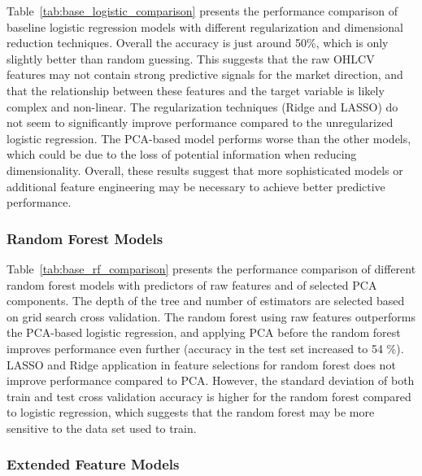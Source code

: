 \documentclass[11pt]{article}
\begin{document}
\FloatBarrier

Table~\ref{tab:base_logistic_comparison} presents the performance comparison of baseline logistic regression models with different regularization and dimensional reduction techniques. Overall the accuracy is just around 50\%, which is only slightly better than random guessing. This suggests that the raw OHLCV features may not contain strong predictive signals for the market direction, and that the relationship between these features and the target variable is likely complex and non-linear. The regularization techniques (Ridge and LASSO) do not seem to significantly improve performance compared to the unregularized logistic regression. The PCA-based model performs worse than the other models, which could be due to the loss of potential information when reducing dimensionality. Overall, these results suggest that more sophisticated models or additional feature engineering may be necessary to achieve better predictive performance.

\subsubsection{Random Forest Models}%



\FloatBarrier

Table~\ref{tab:base_rf_comparison} presents the performance comparison of different random forest models with predictors of raw features and of selected PCA components. The depth of the tree and number of estimators are selected based on grid search cross validation. The random forest using raw features outperforms the PCA-based logistic regression, and applying PCA before the random forest improves performance even further (accuracy in the test set increased to 54 \%). LASSO and Ridge application in feature selections for random forest does not improve performance compared to PCA. However, the standard deviation of both train and test cross validation accuracy is higher for the random forest compared to logistic regression, which suggests that the random forest may be more sensitive to the data set used to train. 


\subsubsection{Extended Feature Models}
\end{document}
